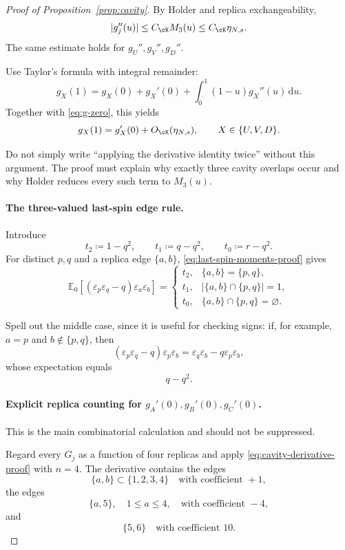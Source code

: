 \begin{proof}[Proof of Proposition~\ref{prop:cavity}]
By Holder and replica exchangeability,
\[
 |g_j''(u)|
 \le C_{\cK}M_3(u)
 \le C_{\cK}\eta_{N,s}.
\]
The same estimate holds for $g_U'',g_V'',g_D''$.

Use Taylor's formula with integral remainder:
\[
 g_X(1)
 =
 g_X(0)+g_X'(0)
 +\int_0^1(1-u)g_X''(u)\,\mathrm du.
\]
Together with \eqref{eq:g-zero}, this yields
\begin{equation}
 g_X(1)
 =
 g_X'(0)+O_{\cK}(\eta_{N,s}),
 \qquad
 X\in\{U,V,D\}.
 \label{eq:cavity-Taylor-modes}
\end{equation}

Do not simply write ``applying the derivative identity twice'' without this
argument.  The proof must explain why exactly three cavity overlaps occur and
why Holder reduces every such term to $M_3(u)$.

\paragraph{The three-valued last-spin edge rule.}

Introduce
\[
 t_2\coloneqq1-q^2,
 \qquad
 t_1\coloneqq q-q^2,
 \qquad
 t_0\coloneqq r-q^2.
\]
For distinct $p,q$ and a replica edge $\{a,b\}$,
\eqref{eq:last-spin-moments-proof} gives
\begin{equation}
 \mathbb E_0[
 (\varepsilon_p\varepsilon_q-q)
 \varepsilon_a\varepsilon_b
 ]
 =
 \begin{cases}
 t_2,
 &\{a,b\}=\{p,q\},\\
 t_1,
 &|\{a,b\}\cap\{p,q\}|=1,\\
 t_0,
 &\{a,b\}\cap\{p,q\}=\varnothing.
 \end{cases}
 \label{eq:edge-rule-proof}
\end{equation}

Spell out the middle case, since it is useful for checking signs:
if, for example, $a=p$ and $b\notin\{p,q\}$, then
\[
 (\varepsilon_p\varepsilon_q-q)
 \varepsilon_p\varepsilon_b
 =
 \varepsilon_q\varepsilon_b
 -q\varepsilon_p\varepsilon_b,
\]
whose expectation equals
\[
 q-q^2.
\]

\paragraph{Explicit replica counting for $g_A'(0),g_B'(0),g_C'(0)$.}

This is the main combinatorial calculation and should not be suppressed.

Regard every $G_j$ as a function of four replicas and apply
\eqref{eq:cavity-derivative-proof} with $n=4$.  The derivative contains the
edges
\[
 \{a,b\}\subset\{1,2,3,4\}
 \quad\text{with coefficient }+1,
\]
the edges
\[
 \{a,5\},
 \quad 1\le a\le4,
 \quad\text{with coefficient }-4,
\]
and
\[
 \{5,6\}
 \quad\text{with coefficient }10.
\]


\end{proof}
